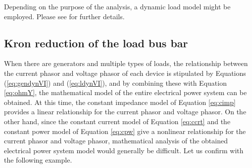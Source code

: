 \documentclass[graybox, envcountchap]{svmult}
\begin{document}
Depending on the purpose of the analysis, a dynamic load model might be employed.
Please see \cite[Section 7.1.2]{kundur1994power} for further details.


\subsection{Kron reduction of the load bus bar}

When there are generators and multiple types of loads, the relationship between the current phasor and voltage phasor of each device is stipulated by Equations (\ref{eq:gendynVI}) and (\ref{eq:ldynVI}), and by combining these with Equation \ref{eq:ohmY}, the mathematical model of the entire electrical power system can be obtained.
At this time, the constant impedance model of Equation \ref{eq:cimp} provides a linear relationship for the current phasor and voltage phasor.
On the other hand, since the constant current model of Equation \ref{eq:ccrt} and the constant power model of Equation \ref{eq:cpw} give a nonlinear relationship for the current phasor and voltage phasor, mathematical analysis of the obtained electrical power system model would generally be difficult.
Let us confirm with the following example.
\end{document}
